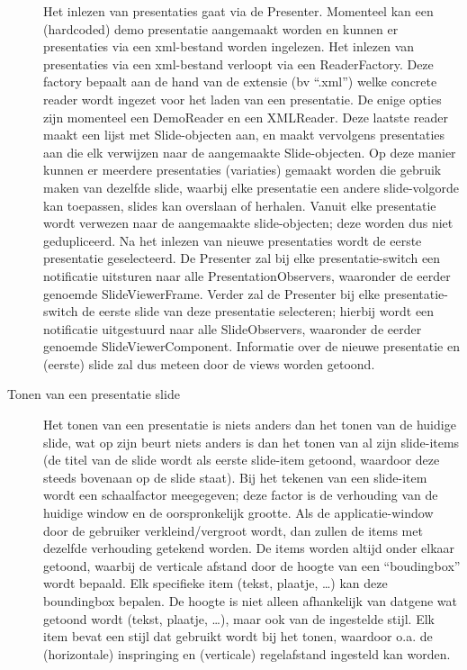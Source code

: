 \documentclass[a4paper]{article}
\begin{document}
\begin{description}
Het inlezen van presentaties gaat via de Presenter. Momenteel kan een (hardcoded) demo presentatie aangemaakt worden en kunnen er presentaties via een xml-bestand worden ingelezen. Het inlezen van presentaties via een xml-bestand verloopt via een ReaderFactory. Deze factory bepaalt aan de hand van de extensie (bv “.xml”) welke concrete reader wordt ingezet voor het laden van een presentatie. De enige opties zijn momenteel een DemoReader en een XMLReader. Deze laatste reader maakt een lijst met Slide-objecten aan, en maakt vervolgens presentaties aan die elk verwijzen naar de aangemaakte Slide-objecten. Op deze manier kunnen er meerdere presentaties (variaties) gemaakt worden die gebruik maken van dezelfde slide, waarbij elke presentatie een andere slide-volgorde kan toepassen, slides kan overslaan of herhalen. Vanuit elke presentatie wordt verwezen naar de aangemaakte slide-objecten; deze worden dus niet gedupliceerd.
Na het inlezen van nieuwe presentaties wordt de eerste presentatie geselecteerd. De Presenter zal bij elke presentatie-switch een notificatie uitsturen naar alle PresentationObservers, waaronder de eerder genoemde SlideViewerFrame. Verder zal de Presenter bij elke presentatie-switch de eerste slide van deze presentatie selecteren; hierbij wordt een notificatie uitgestuurd naar alle SlideObservers, waaronder de eerder genoemde SlideViewerComponent. Informatie over de nieuwe presentatie en (eerste) slide zal dus meteen door de views worden getoond.
\item[Tonen van een presentatie slide]
Het tonen van een presentatie is niets anders dan het tonen van de huidige slide, wat op zijn beurt niets anders is dan het tonen van al zijn slide-items (de titel van de slide wordt als eerste slide-item getoond, waardoor deze steeds bovenaan op de slide staat). Bij het tekenen van een slide-item wordt een schaalfactor meegegeven; deze factor is de verhouding van de huidige window en de oorspronkelijk grootte. Als de applicatie-window door de gebruiker verkleind/vergroot wordt, dan zullen de items met dezelfde verhouding getekend worden.
De items worden altijd onder elkaar getoond, waarbij de verticale afstand door de hoogte van een “boudingbox” wordt bepaald. Elk specifieke item (tekst, plaatje, …) kan deze boundingbox bepalen. De hoogte is niet alleen afhankelijk van datgene wat getoond wordt (tekst, plaatje, …), maar ook van de ingestelde stijl. Elk item bevat een stijl dat gebruikt wordt bij het tonen, waardoor o.a. de (horizontale) inspringing en (verticale) regelafstand ingesteld kan worden.
\end{description}
\end{document}
